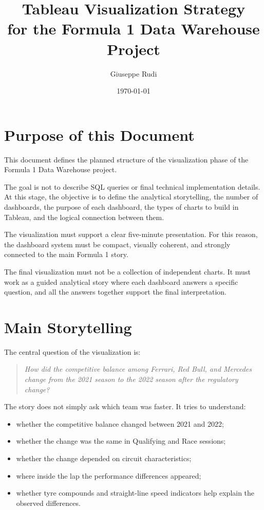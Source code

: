 \documentclass[12pt,a4paper]{article}
\title{Tableau Visualization Strategy\\
	for the Formula 1 Data Warehouse Project}
\author{Giuseppe Rudi}
\date{\today}
\begin{document}
	
	\maketitle
	
	\tableofcontents
	\newpage
	
	\section{Purpose of this Document}
	
	This document defines the planned structure of the visualization phase of the Formula 1 Data Warehouse project.
	
	The goal is not to describe SQL queries or final technical implementation details.
	At this stage, the objective is to define the analytical storytelling, the number of dashboards, the purpose of each dashboard, the types of charts to build in Tableau, and the logical connection between them.
	
	The visualization must support a clear five-minute presentation.
	For this reason, the dashboard system must be compact, visually coherent, and strongly connected to the main Formula 1 story.
	
	The final visualization must not be a collection of independent charts.
	It must work as a guided analytical story where each dashboard answers a specific question, and all the answers together support the final interpretation.
	
	\section{Main Storytelling}
	
	The central question of the visualization is:
	
	\begin{quote}
		\textit{How did the competitive balance among Ferrari, Red Bull, and Mercedes change from the 2021 season to the 2022 season after the regulatory change?}
	\end{quote}
	
	The story does not simply ask which team was faster.
	It tries to understand:
	
	\begin{itemize}[leftmargin=1.2cm]
		\item whether the competitive balance changed between 2021 and 2022;
		\item whether the change was the same in Qualifying and Race sessions;
		\item whether the change depended on circuit characteristics;
		\item where inside the lap the performance differences appeared;
		\item whether tyre compounds and straight-line speed indicators help explain the observed differences.
	\end{itemize}
	
\end{document}

